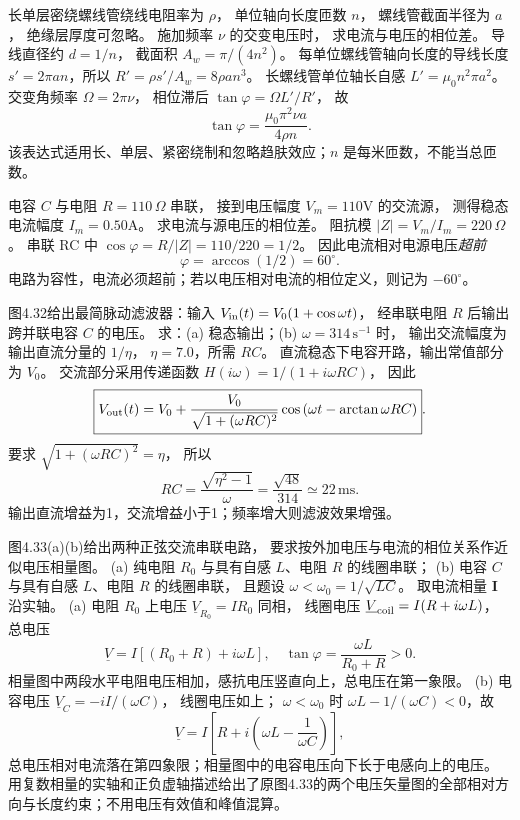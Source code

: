 长单层密绕螺线管绕线电阻率为 $\rho$，
单位轴向长度匝数 $n$，
螺线管截面半径为 $a$，
绝缘层厚度可忽略。
施加频率 $\nu$ 的交变电压时，
求电流与电压的相位差。
\exsolution
导线直径约 $d=1/n$，
截面积 $A_w=\pi/(4n^2)$。
每单位螺线管轴向长度的导线长度
$s'=2\pi an$，所以
$R'=\rho s'/A_w=8\rho an^3$。
长螺线管单位轴长自感
$L'=\mu_0n^2\pi a^2$。
交变角频率 $\Omega=2\pi\nu$，
相位滞后
$\tan\varphi=\Omega L'/R'$，
故
\[
\boxed{\tan\varphi=
\frac{\mu_0\pi^2\nu a}{4\rho n}}.
\]
\excheck 该表达式适用长、单层、紧密绕制和忽略趋肤效应；$n$ 是每米匝数，不能当总匝数。

电容 $C$ 与电阻 $R=110\,\Omega$ 串联，
接到电压幅度 $V_m=110$V 的交流源，
测得稳态电流幅度 $I_m=0.50$A。
求电流与源电压的相位差。
\exsolution
阻抗模
$|Z|=V_m/I_m=220\,\Omega$。
串联 RC 中
$\cos\varphi=R/|Z|=110/220=1/2$。
因此电流相对电源电压\emph{超前}
\[
\boxed{\varphi=\arccos(1/2)=60^\circ}.
\]
\excheck 电路为容性，电流必须超前；若以电压相对电流的相位定义，则记为 $-60^\circ$。

图4.32给出最简脉动滤波器：输入
$V_{\rm in}(t)=V_0(1+\cos\omega t)$，
经串联电阻 $R$ 后输出跨并联电容 $C$ 的电压。
求：(a) 稳态输出；(b) $\omega=314\,\mathrm{s^{-1}}$ 时，
输出交流幅度为输出直流分量的 $1/\eta$，
$\eta=7.0$，所需 $RC$。
\exsolution
直流稳态下电容开路，输出常值部分为 $V_0$。
交流部分采用传递函数
$H(i\omega)=1/(1+i\omega RC)$，
因此
\[
\boxed{V_{\rm out}(t)=V_0+
\frac{V_0}{\sqrt{1+(\omega RC)^2}}
\cos\left(\omega t-\arctan\omega RC\right)}.
\]
要求
$\sqrt{1+(\omega RC)^2}=\eta$，
所以
\[
\boxed{RC=\frac{\sqrt{\eta^2-1}}{\omega}
=\frac{\sqrt{48}}{314}
\simeq22\,\mathrm{ms}}.
\]
\excheck 输出直流增益为1，交流增益小于1；频率增大则滤波效果增强。

图4.33(a)(b)给出两种正弦交流串联电路，
要求按外加电压与电流的相位关系作近似电压相量图。
(a) 纯电阻 $R_0$ 与具有自感 $L$、电阻 $R$ 的线圈串联；
(b) 电容 $C$ 与具有自感 $L$、电阻 $R$ 的线圈串联，
且题设 $\omega<\omega_0=1/\sqrt{LC}$。
\exsolution
取电流相量 $\bm I$ 沿实轴。
(a) 电阻 $R_0$ 上电压
$\underline V_{R_0}=IR_0$ 同相，
线圈电压
$\underline V_{\rm coil}=I(R+i\omega L)$，
总电压
\[
\boxed{\underline V=I[(R_0+R)+i\omega L]},
\quad
\tan\varphi=\frac{\omega L}{R_0+R}>0.
\]
相量图中两段水平电阻电压相加，感抗电压竖直向上，总电压在第一象限。
(b) 电容电压
$\underline V_C=-iI/(\omega C)$，
线圈电压如上；
$\omega<\omega_0$ 时
$\omega L-1/(\omega C)<0$，故
\[
\boxed{\underline V=I\left[
R+i\left(\omega L-\frac1{\omega C}\right)\right]},
\]
总电压相对电流落在第四象限；相量图中的电容电压向下长于电感向上的电压。
\excheck 用复数相量的实轴和正负虚轴描述给出了原图4.33的两个电压矢量图的全部相对方向与长度约束；不用电压有效值和峰值混算。

